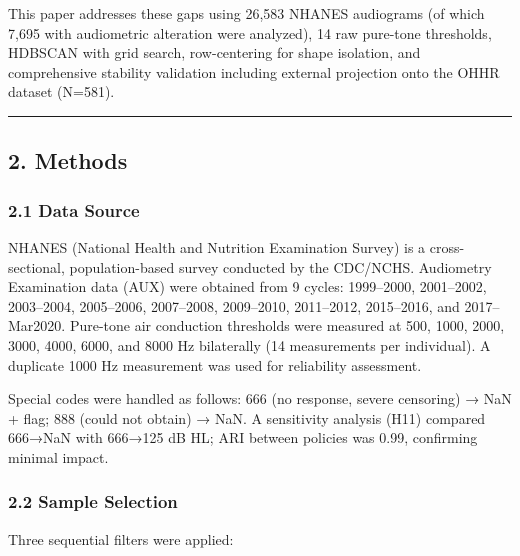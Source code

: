 \documentclass[
]{article}
\begin{document}
This paper addresses these gaps using 26,583 NHANES audiograms (of which 7,695
with audiometric alteration were analyzed), 14 raw pure-tone thresholds, HDBSCAN
with grid search, row-centering for shape isolation, and comprehensive stability
validation including external projection onto the OHHR dataset (N=581).

\begin{center}\rule{0.5\linewidth}{0.5pt}\end{center}

\subsection{2. Methods}\label{methods}

\subsubsection{2.1 Data Source}\label{data-source}

NHANES (National Health and Nutrition Examination Survey) is a cross-sectional,
population-based survey conducted by the CDC/NCHS. Audiometry Examination data
(AUX) were obtained from 9 cycles: 1999--2000, 2001--2002, 2003--2004,
2005--2006, 2007--2008, 2009--2010, 2011--2012, 2015--2016, and 2017--Mar2020.
Pure-tone air conduction thresholds were measured at 500, 1000, 2000, 3000,
4000, 6000, and 8000 Hz bilaterally (14 measurements per individual). A
duplicate 1000 Hz measurement was used for reliability assessment.

Special codes were handled as follows: 666 (no response, severe censoring) → NaN
+ flag; 888 (could not obtain) → NaN. A sensitivity analysis (H11) compared
666→NaN with 666→125 dB HL; ARI between policies was 0.99, confirming minimal
impact.

\subsubsection{2.2 Sample Selection}\label{sample-selection}

Three sequential filters were applied:
\end{document}
